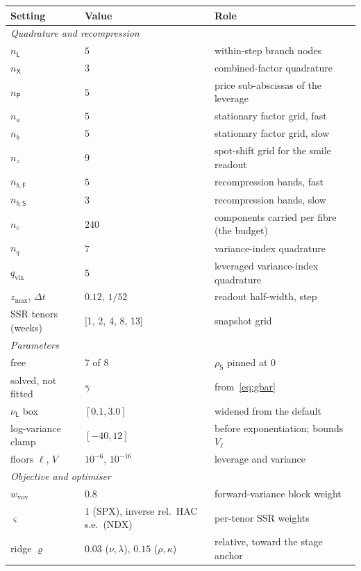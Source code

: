 \begin{tabular}{lll}
\toprule
Setting & Value & Role \\
\midrule
\multicolumn{3}{l}{\emph{Quadrature and recompression}} \\
\quad $n_{\mathsf L}$ & $5$ & within-step branch nodes \\
\quad $n_{\mathsf X}$ & $3$ & combined-factor quadrature \\
\quad $n_{\mathsf P}$ & $5$ & price sub-abscissas of the leverage \\
\quad $n_a$ & $5$ & stationary factor grid, fast \\
\quad $n_b$ & $5$ & stationary factor grid, slow \\
\quad $n_z$ & $9$ & spot-shift grid for the smile readout \\
\quad $n_{b,\mathsf F}$ & $5$ & recompression bands, fast \\
\quad $n_{b,\mathsf S}$ & $3$ & recompression bands, slow \\
\quad $n_c$ & $240$ & components carried per fibre (the budget) \\
\quad $n_q$ & $7$ & variance-index quadrature \\
\quad $q_{\mathrm{vix}}$ & $5$ & leveraged variance-index quadrature \\
\quad $z_{\max}$, $\Delta t$ & $0.12$, $1/52$ & readout half-width, step \\
\quad SSR tenors (weeks) & [1, 2, 4, 8, 13] & snapshot grid \\
\midrule
\multicolumn{3}{l}{\emph{Parameters}} \\
\quad free & 7 of 8 & $\rho_{\mathsf S}$ pinned at $0$ \\
\quad solved, not fitted & $\bar\gamma$ & from~\eqref{eq:gbar} \\
\quad $\nu_{\mathsf L}$ box & $[0.1, 3.0]$ & widened from the default \\
\quad log-variance clamp & $[-40, 12]$ & before exponentiation; bounds $V_\ell$ \\
\quad floors $\ell$, $V$ & $10^{-6}$, $10^{-16}$ & leverage and variance \\
\midrule
\multicolumn{3}{l}{\emph{Objective and optimiser}} \\
\quad $w_{\mathrm{vov}}$ & $0.8$ & forward-variance block weight \\
\quad $\varsigma$ & $1$ (SPX), inverse rel.\ HAC s.e.\ (NDX) & per-tenor SSR weights \\
\quad ridge $\varrho$ & $0.03$ ($\nu,\lambda$), $0.15$ ($\rho,\kappa$) & relative, toward the stage anchor \\

\end{tabular}

